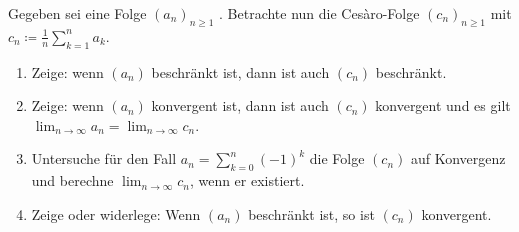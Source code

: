 \begin{prob}
  Gegeben sei eine Folge $(a_n)_{n \geq 1}$ . Betrachte nun die Cesàro-Folge
  $(c_n)_{n \geq 1}$ mit $c_n \coloneqq \frac{1}{n} \sum_{k = 1}^n a_k$.
  \begin{enumerate}[label=(\alph*)]
  \item Zeige: wenn $(a_n)$ beschränkt ist, dann ist auch $(c_n)$ beschränkt.
  \item Zeige: wenn $(a_n)$ konvergent ist, dann ist auch $(c_n)$ konvergent und
    es gilt $\lim_{n\to\infty} a_n = \lim_{n\to\infty} c_n$.
  \item Untersuche für den Fall $a_n=\sum_{k=0}^n(-1)^k$ die Folge $(c_n)$ auf
    Konvergenz und berechne $\lim_{n\to\infty} c_n$, wenn er existiert.
  \item Zeige oder widerlege: Wenn $(a_n)$ beschränkt ist, so ist $(c_n)$
    konvergent.
  \end{enumerate}
\end{prob}
